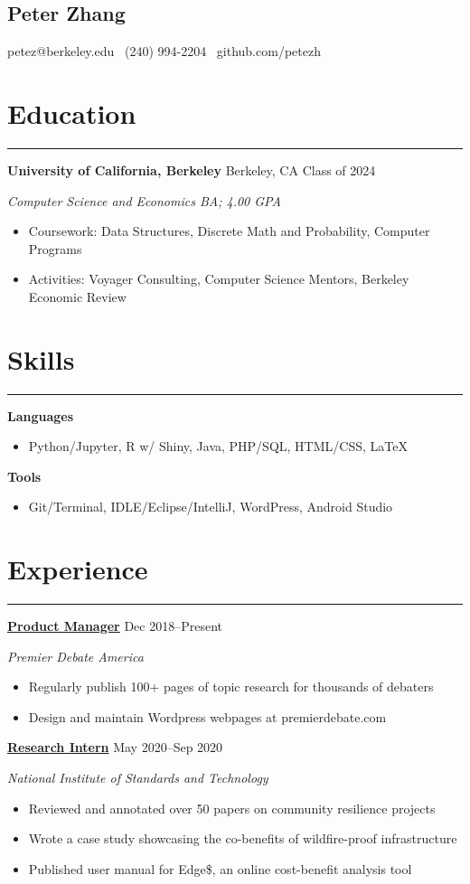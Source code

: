 \documentclass[11pt]{article}
\newcommand{\name}[1]{\begin{center}\section*{\huge \color{highlight} #1}\end{center}}
\newcommand{\topinfo}[1]{\begin{center}\vspace{-0.2cm}#1\vspace{-0.2cm}\end{center}}
\newcommand{\resumesection}[1]{\vspace{-0.3cm}\section*{\color{highlight}#1}\vspace{-0.3cm}\hrule\vspace{0.3cm}}
\begin{document}
\name{Peter Zhang}
\topinfo{petez@berkeley.edu \textbullet\ (240) 994-2204 \textbullet\ github.com/petezh}

\resumesection{Education}

\textbf{University of California, Berkeley} Berkeley, CA \hfill Class of 2024 \par
\textit{Computer Science and Economics BA; 4.00 GPA}
\begin{itemize}
	\item Coursework: Data Structures, Discrete Math and Probability, Computer Programs
	\item Activities: Voyager Consulting, Computer Science Mentors, Berkeley Economic Review
\end{itemize}

\resumesection{Skills}

\textbf{Languages}
\begin{itemize} 
	\item Python/Jupyter, R w/ Shiny, Java, PHP/SQL, HTML/CSS, \LaTeX
\end{itemize}\vspace{0.1cm}

\textbf{Tools}
\begin{itemize} 
	\item Git/Terminal,  IDLE/Eclipse/IntelliJ, WordPress, Android Studio
\end{itemize}

\resumesection{Experience}

\textbf{\href{https://www.premierdebate.com/briefs/}{Product Manager}} \hfill Dec 2018--Present \par
\textit{Premier Debate America}
\begin{itemize}
	\item Regularly publish 100+ pages of topic research for thousands of debaters
	\item Design and maintain Wordpress webpages at premierdebate.com
\end{itemize}

\textbf{\href{https://nvlpubs.nist.gov/nistpubs/SpecialPublications/NIST.SP.1260.pdf}{Research Intern}} \hfill May 2020--Sep 2020 \par
\textit{National Institute of Standards and Technology}
\begin{itemize}
	\item Reviewed and annotated over 50 papers on community resilience projects
	\item Wrote a case study showcasing the co-benefits of wildfire-proof infrastructure
	\item Published user manual for Edge\$, an online cost-benefit analysis tool
\end{itemize}\vspace{0.1cm}
\end{document}
